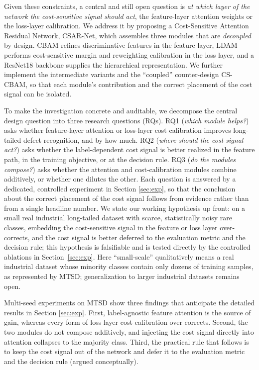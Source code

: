 \documentclass[a4paper,fleqn]{cas-sc}
\begin{document}
\begin{sloppypar}
	\par{
		Given these constraints, a central and still open question is \emph{at which layer of the network the cost-sensitive signal should act}, the feature-layer attention weights or the loss-layer calibration. We address it by proposing a Cost-Sensitive Attention Residual Network, CSAR-Net, which assembles three modules that are \emph{decoupled} by design. CBAM \citep{woo2018cbam} refines discriminative features in the feature layer, LDAM \citep{cao2019learning} performs cost-sensitive margin and reweighting calibration in the loss layer, and a ResNet18 backbone \citep{he2016deep} supplies the hierarchical representation. We further implement the intermediate variants and the ``coupled'' counter-design CS-CBAM, so that each module's contribution and the correct placement of the cost signal can be isolated.
	}

	\par{
		To make the investigation concrete and auditable, we decompose the central design question into three research questions (RQs). RQ1 (\emph{which module helps?}) asks whether feature-layer attention or loss-layer cost calibration improves long-tailed defect recognition, and by how much. RQ2 (\emph{where should the cost signal act?}) asks whether the label-dependent cost signal is better realized in the feature path, in the training objective, or at the decision rule. RQ3 (\emph{do the modules compose?}) asks whether the attention and cost-calibration modules combine additively, or whether one dilutes the other. Each question is answered by a dedicated, controlled experiment in Section \ref{sec:exp}, so that the conclusion about the correct placement of the cost signal follows from evidence rather than from a single headline number. We state our working hypothesis up front: on a small real industrial long-tailed dataset with scarce, statistically noisy rare classes, embedding the cost-sensitive signal in the feature or loss layer over-corrects, and the cost signal is better deferred to the evaluation metric and the decision rule; this hypothesis is falsifiable and is tested directly by the controlled ablations in Section~\ref{sec:exp}. Here ``small-scale'' qualitatively means a real industrial dataset whose minority classes contain only dozens of training samples, as represented by MTSD; generalization to larger industrial datasets remains open.
	}

	\par{
		Multi-seed experiments on MTSD show three findings that anticipate the detailed results in Section \ref{sec:exp}. First, label-agnostic feature attention is the source of gain, whereas every form of loss-layer cost calibration over-corrects. Second, the two modules do not compose additively, and injecting the cost signal directly into attention collapses to the majority class. Third, the practical rule that follows is to keep the cost signal out of the network and defer it to the evaluation metric and the decision rule (argued conceptually).
	}


\end{sloppypar}
\end{document}
